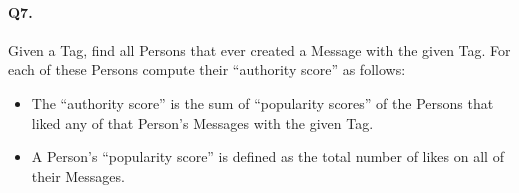 \paragraph{Q7.}
Given a Tag, find all Persons that ever created a Message with the given
Tag. For each of these Persons compute their ``authority score'' as
follows:
\begin{itemize}
\tightlist
\item
  The ``authority score'' is the sum of ``popularity scores'' of the
  Persons that liked any of that Person's Messages with the given Tag.
\item
  A Person's ``popularity score'' is defined as the total number of
  likes on all of their Messages.
\end{itemize}
